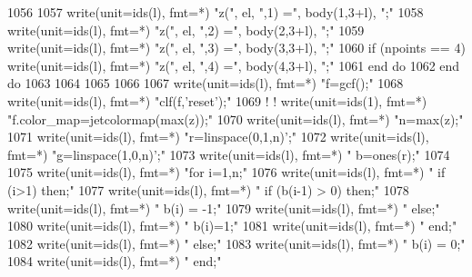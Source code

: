 \begin{DoxyCode}
1056 
1057             \textcolor{keyword}{write}(unit=ids(l), fmt=*) \textcolor{stringliteral}{"z("}, el, \textcolor{stringliteral}{",1) ="}, body(1,3+l), \textcolor{stringliteral}{";"}
1058             \textcolor{keyword}{write}(unit=ids(l), fmt=*) \textcolor{stringliteral}{"z("}, el, \textcolor{stringliteral}{",2) ="}, body(2,3+l), \textcolor{stringliteral}{";"}
1059             \textcolor{keyword}{write}(unit=ids(l), fmt=*) \textcolor{stringliteral}{"z("}, el, \textcolor{stringliteral}{",3) ="}, body(3,3+l), \textcolor{stringliteral}{";"}
1060             \textcolor{keywordflow}{if} (npoints == 4) \textcolor{keyword}{write}(unit=ids(l), fmt=*) \textcolor{stringliteral}{"z("}, el, \textcolor{stringliteral}{",4) ="}\textcolor{comment}{, body(4,3+l), }\textcolor{stringliteral}{";"}
1061 \textcolor{keywordflow}{        end do}
1062 \textcolor{keywordflow}{      end do}
1063       
1064     
1065       
1066 
1067       \textcolor{keyword}{write}(unit=ids(l), fmt=*) \textcolor{stringliteral}{"f=gcf();"}
1068       \textcolor{keyword}{write}(unit=ids(l), fmt=*) \textcolor{stringliteral}{"clf(f,'reset');"}
1069 \textcolor{comment}{! !       write(unit=ids(1), fmt=*) "f.color\_map=jetcolormap(max(z));"}
1070       \textcolor{keyword}{write}(unit=ids(l), fmt=*) \textcolor{stringliteral}{"n=max(z);"}
1071       \textcolor{keyword}{write}(unit=ids(l), fmt=*)  \textcolor{stringliteral}{"r=linspace(0,1,n)';"}
1072       \textcolor{keyword}{write}(unit=ids(l), fmt=*)  \textcolor{stringliteral}{"g=linspace(1,0,n)';"}
1073       \textcolor{keyword}{write}(unit=ids(l), fmt=*)  \textcolor{stringliteral}{" b=ones(r);"}
1074 
1075       \textcolor{keyword}{write}(unit=ids(l), fmt=*) \textcolor{stringliteral}{"for i=1,n;"}
1076       \textcolor{keyword}{write}(unit=ids(l), fmt=*) \textcolor{stringliteral}{"    if (i>1) then;"}
1077       \textcolor{keyword}{write}(unit=ids(l), fmt=*) \textcolor{stringliteral}{"        if (b(i-1) > 0) then;"}
1078       \textcolor{keyword}{write}(unit=ids(l), fmt=*) \textcolor{stringliteral}{"            b(i) = -1;"}
1079       \textcolor{keyword}{write}(unit=ids(l), fmt=*) \textcolor{stringliteral}{"        else;"}
1080       \textcolor{keyword}{write}(unit=ids(l), fmt=*) \textcolor{stringliteral}{"            b(i)=1;"}
1081       \textcolor{keyword}{write}(unit=ids(l), fmt=*) \textcolor{stringliteral}{"        end;"}
1082       \textcolor{keyword}{write}(unit=ids(l), fmt=*) \textcolor{stringliteral}{"    else;"}
1083       \textcolor{keyword}{write}(unit=ids(l), fmt=*) \textcolor{stringliteral}{"        b(i) = 0;"}
1084       \textcolor{keyword}{write}(unit=ids(l), fmt=*) \textcolor{stringliteral}{"    end;"}

\end{DoxyCode}

